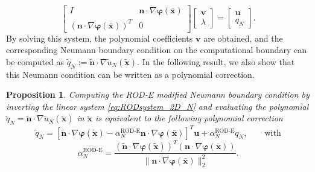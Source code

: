 \documentclass{article}
\renewcommand{\phi}{\varphi}
\newtheorem{proposition}[theorem]{Proposition}%
\begin{document}
\begin{equation}\label{eq:RODsystem_2D_N}
\begin{bmatrix} I & \boldsymbol{n} \cdot \nabla \boldsymbol{\phi}(\bar{\boldsymbol{x}}) \\ (\boldsymbol{n} \cdot \nabla \boldsymbol{\phi}(\bar{\boldsymbol{x}}))^T & 0 \end{bmatrix} \begin{bmatrix}\boldsymbol{v} \\ \lambda \end{bmatrix} = \begin{bmatrix} \boldsymbol{u} \\ q_N \end{bmatrix}.
\end{equation}
By solving this system, the polynomial coefficients $\boldsymbol{v}$ are obtained, and the corresponding Neumann boundary condition on the computational boundary can be computed as $\tilde q_N:=\tilde{\boldsymbol{n}} \cdot \nabla \tilde u_N(\tilde{\boldsymbol{x}})$. In the following result, we also show that this Neumann condition can be written as a polynomial correction.

\begin{proposition}
Computing the ROD-E modified Neumann boundary condition by inverting the linear system \eqref{eq:RODsystem_2D_N} and evaluating the polynomial $\tilde q_N = \tilde{\boldsymbol{n}} \cdot \nabla \tilde u_N(\tilde{\boldsymbol{x}})$ in $\tilde{\boldsymbol{x}}$ is equivalent to the following polynomial correction
\begin{equation}\label{eq:rodN_final_2D}
    \tilde q_N = [\tilde{\boldsymbol{n}} \cdot \nabla \boldsymbol{\phi}(\tilde{\boldsymbol{x}}) - \alpha_N^{\text{ROD-E}} \boldsymbol{n} \cdot \nabla \boldsymbol{\phi}(\bar{\boldsymbol{x}})]^T \boldsymbol{u} + \alpha_N^{\text{ROD-E}} q_N , \quad \quad \text{with} 
\end{equation}
\begin{equation}
    \alpha_N^{\text{ROD-E}} = \frac{(\tilde{\boldsymbol{n}} \cdot \nabla \boldsymbol{\phi}(\tilde{\boldsymbol{x}}))^T (\boldsymbol{n} \cdot \nabla \boldsymbol{\phi}(\bar{\boldsymbol{x}}))}{\|\boldsymbol{n} \cdot \nabla \boldsymbol{\phi}(\bar{\boldsymbol{x}})\|_2^2}.
\end{equation}
\end{proposition}
\end{document}
